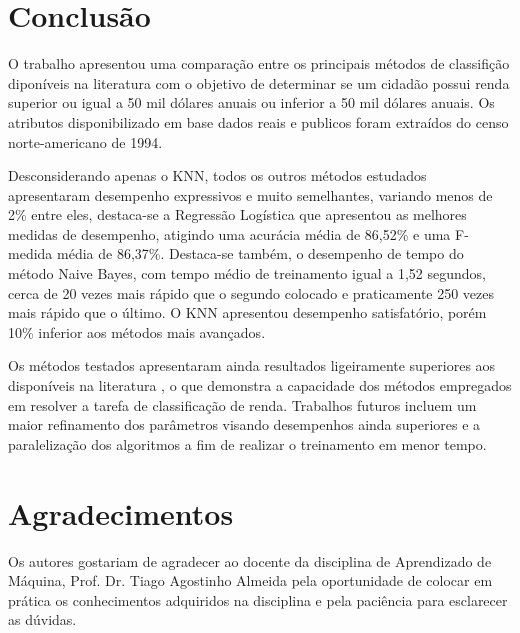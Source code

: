 \section{Conclusão}

O trabalho apresentou uma comparação entre os principais métodos de classifição diponíveis na literatura com o objetivo de determinar se um cidadão possui renda superior ou igual a 50 mil dólares anuais ou inferior a 50 mil dólares anuais. Os atributos disponibilizado em base dados reais e publicos foram extraídos do censo norte-americano de 1994.

Desconsiderando apenas o KNN, todos os outros métodos estudados apresentaram desempenho expressivos e muito semelhantes, variando menos de 2\% entre eles, destaca-se a Regressão Logística que apresentou as melhores medidas de desempenho, atigindo uma acurácia média de 86,52\% e uma F-medida média de 86,37\%. Destaca-se também, o desempenho de tempo do método Naive Bayes, com tempo médio de treinamento igual a 1,52 segundos, cerca de 20 vezes mais rápido que o segundo colocado e praticamente 250 vezes mais rápido que o último. O KNN apresentou desempenho satisfatório, porém 10\% inferior aos métodos mais avançados.

Os métodos testados apresentaram ainda resultados ligeiramente superiores aos disponíveis na literatura \cite{base2}, o que demonstra a capacidade dos métodos empregados em resolver a tarefa de classificação de renda. Trabalhos futuros incluem um maior refinamento dos parâmetros visando desempenhos ainda superiores e a paralelização dos algoritmos a fim de realizar o treinamento em menor tempo.

\section*{Agradecimentos}
Os autores gostariam de agradecer ao docente da disciplina de Aprendizado de Máquina, Prof. Dr. Tiago Agostinho Almeida pela oportunidade de colocar em prática os conhecimentos adquiridos na disciplina e pela paciência para esclarecer as dúvidas.